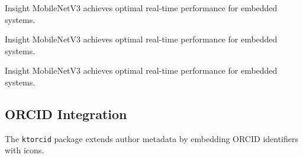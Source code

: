 \documentclass[12pt,onecolumn]{article}
\begin{document}
    \begin{ktboxnumbered}[theme=magenta]{Insight}
      MobileNetV3 achieves optimal real-time performance for embedded systems.
    \end{ktboxnumbered}

    \begin{ktboxnumbered}[theme=gray]{Insight}
      MobileNetV3 achieves optimal real-time performance for embedded systems.
    \end{ktboxnumbered}

    \begin{ktboxnumbered}[theme=white]{Insight}
      MobileNetV3 achieves optimal real-time performance for embedded systems.
    \end{ktboxnumbered}

  \subsection{ORCID Integration}
  \label{sec:orcid}
    The \texttt{ktorcid} package extends author metadata by embedding ORCID identifiers with icons.

    \begin{ktbox}[theme=gray]
\begin{codeblock}
  \author{Bhaskar Mangal}
\end{codeblock}
    \end{ktbox}
\end{document}

